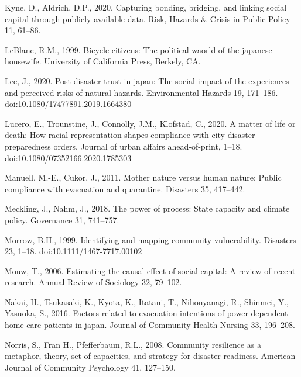 \documentclass[]{elsarticle} %
\newlength{\cslhangindent}
\newlength{\cslentryspacingunit} %
\newenvironment{CSLReferences}[2] %
 {%
  \setlength{\parindent}{0pt}
  \ifodd #1
  \let\oldpar\par
  \def\par{\hangindent=\cslhangindent\oldpar}
  \fi
  \setlength{\parskip}{#2\cslentryspacingunit}
 }%
 {}
\begin{document}
\begin{CSLReferences}{1}{0}
\leavevmode{}%
Kyne, D., Aldrich, D.P., 2020. Capturing bonding, bridging, and linking
social capital through publicly available data. Risk, Hazards \& Crisis
in Public Policy 11, 61--86.

\leavevmode{}%
LeBlanc, R.M., 1999. Bicycle citizens: The political waorld of the
japanese housewife. University of California Press, Berkely, CA.

\leavevmode{}%
Lee, J., 2020. Post-disaster trust in japan: The social impact of the
experiences and perceived risks of natural hazards. Environmental
Hazards 19, 171--186.
doi:\href{https://doi.org/10.1080/17477891.2019.1664380}{10.1080/17477891.2019.1664380}

\leavevmode{}%
Lucero, E., Trounstine, J., Connolly, J.M., Klofstad, C., 2020. A matter
of life or death: How racial representation shapes compliance with city
disaster preparedness orders. Journal of urban affairs ahead-of-print,
1--18.
doi:\href{https://doi.org/10.1080/07352166.2020.1785303}{10.1080/07352166.2020.1785303}

\leavevmode{}%
Manuell, M.-E., Cukor, J., 2011. Mother nature versus human nature:
Public compliance with evacuation and quarantine. Disasters 35,
417--442.

\leavevmode{}%
Meckling, J., Nahm, J., 2018. The power of process: State capacity and
climate policy. Governance 31, 741--757.

\leavevmode{}%
Morrow, B.H., 1999. Identifying and mapping community vulnerability.
Disasters 23, 1--18.
doi:\href{https://doi.org/10.1111/1467-7717.00102}{10.1111/1467-7717.00102}

\leavevmode{}%
Mouw, T., 2006. Estimating the causal effect of social capital: A review
of recent research. Annual Review of Sociology 32, 79--102.

\leavevmode{}%
Nakai, H., Tsukasaki, K., Kyota, K., Itatani, T., Nihonyanagi, R.,
Shinmei, Y., Yasuoka, S., 2016. Factors related to evacuation intentions
of power-dependent home care patients in japan. Journal of Community
Health Nursing 33, 196--208.

\leavevmode{}%
Norris, S., Fran H., Pfefferbaum, R.L., 2008. Community resilience as a
metaphor, theory, set of capacities, and strategy for disaster
readiness. American Journal of Community Psychology 41, 127--150.


\end{CSLReferences}
\end{document}

